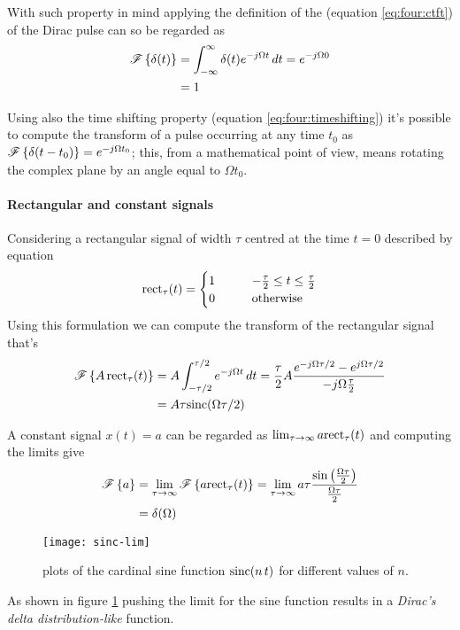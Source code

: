 	With such property in mind applying the definition of the \ctft (equation \ref{eq:four:ctft}) of the Dirac pulse can so be regarded as
	\begin{equation} \label{eq:four:impulsetransf}
	\begin{aligned}
		\mathscr{F}\left\{ \delta(t) \right\} & = \int_{-\infty}^\infty \delta(t) e^{-j\Omega t}\, dt = e^{-j\Omega 0} \\ & = 1
	\end{aligned}
	\end{equation}
	
	Using also the time shifting property (equation \ref{eq:four:timeshifting}) it's possible to compute the transform of a pulse occurring at any time $t_0$ as $\mathscr{F}\left\{ \delta(t-t_0) \right\} = e^{-j\Omega t_0}$; this, from a mathematical point of view, means rotating the complex plane by an angle equal to $\Omega t_0$.
	
	\paragraph{Rectangular and constant signals} Considering a rectangular signal of width $\tau$ centred at the time $t=0$ described by equation
	\[ \textrm{rect}_\tau(t) = \begin{cases}
		1 \qquad & -\frac \tau 2 \leq t \leq \frac \tau 2 \\ 0 & \textrm{otherwise}
	\end{cases}  \]
	Using this formulation we can compute the transform of the rectangular signal that's
	\begin{equation}
	\begin{aligned}
		\mathscr{F}\left\{ A \, \textrm{rect}_\tau(t) \right\}	& =	 A \int_{-\tau/2}^{\tau/2} e ^{-j\Omega t} \, dt = \frac \tau 2 A \frac{e^{-j\Omega \tau/2} - e^{j\Omega \tau/2}}{-j\Omega \frac \tau 2} \\ & = A \tau \textrm{sinc} (\Omega \tau/2)
	\end{aligned}	
	\end{equation}
	
	A constant signal $x(t) = a$ can be regarded as $\lim_{\tau\rightarrow \infty} a \textrm{rect}_\tau(t)$ and computing the limits give
	\begin{equation}
	\begin{aligned} \label{eq:four:consttransform}
		\mathscr{F}\left\{ a \right\} & = \lim_{\tau\rightarrow\infty} \mathscr{F}\left\{ a \textrm{rect}_\tau(t) \right\} = \lim_{\tau\rightarrow\infty} a \tau \frac{\sin \left(\frac{\Omega \tau}{2}\right)}{\frac{\Omega \tau}{2}} \\
		& = \delta (\Omega)
	\end{aligned}
	\end{equation}	
	\begin{SCfigure}[2][b]
		\centering \texttt{[image: sinc-lim]}
		\caption{plots of the cardinal sine function $\textrm{sinc}(n \,t)$ for different values of $n$.} \label{fig:four:sinclim}
	\end{SCfigure}
	As shown in figure \ref{fig:four:sinclim} pushing the limit for the sine function results in a \textit{Dirac's delta distribution-like} function.
	
